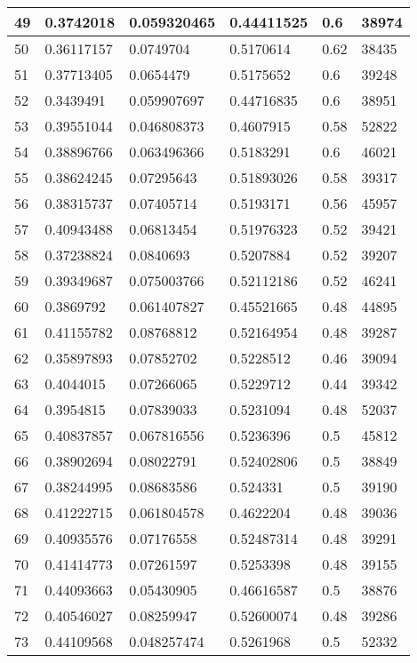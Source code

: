 \begin{longtable}{|l|l|l|l|l|l|}
49 & 0.3742018 & 0.059320465 & 0.44411525 & 0.6 & 38974 \\ \hline 
50 & 0.36117157 & 0.0749704 & 0.5170614 & 0.62 & 38435 \\ \hline 
51 & 0.37713405 & 0.0654479 & 0.5175652 & 0.6 & 39248 \\ \hline 
52 & 0.3439491 & 0.059907697 & 0.44716835 & 0.6 & 38951 \\ \hline 
53 & 0.39551044 & 0.046808373 & 0.4607915 & 0.58 & 52822 \\ \hline 
54 & 0.38896766 & 0.063496366 & 0.5183291 & 0.6 & 46021 \\ \hline 
55 & 0.38624245 & 0.07295643 & 0.51893026 & 0.58 & 39317 \\ \hline 
56 & 0.38315737 & 0.07405714 & 0.5193171 & 0.56 & 45957 \\ \hline 
57 & 0.40943488 & 0.06813454 & 0.51976323 & 0.52 & 39421 \\ \hline 
58 & 0.37238824 & 0.0840693 & 0.5207884 & 0.52 & 39207 \\ \hline 
59 & 0.39349687 & 0.075003766 & 0.52112186 & 0.52 & 46241 \\ \hline 
60 & 0.3869792 & 0.061407827 & 0.45521665 & 0.48 & 44895 \\ \hline 
61 & 0.41155782 & 0.08768812 & 0.52164954 & 0.48 & 39287 \\ \hline 
62 & 0.35897893 & 0.07852702 & 0.5228512 & 0.46 & 39094 \\ \hline 
63 & 0.4044015 & 0.07266065 & 0.5229712 & 0.44 & 39342 \\ \hline 
64 & 0.3954815 & 0.07839033 & 0.5231094 & 0.48 & 52037 \\ \hline 
65 & 0.40837857 & 0.067816556 & 0.5236396 & 0.5 & 45812 \\ \hline 
66 & 0.38902694 & 0.08022791 & 0.52402806 & 0.5 & 38849 \\ \hline 
67 & 0.38244995 & 0.08683586 & 0.524331 & 0.5 & 39190 \\ \hline 
68 & 0.41222715 & 0.061804578 & 0.4622204 & 0.48 & 39036 \\ \hline 
69 & 0.40935576 & 0.07176558 & 0.52487314 & 0.48 & 39291 \\ \hline 
70 & 0.41414773 & 0.07261597 & 0.5253398 & 0.48 & 39155 \\ \hline 
71 & 0.44093663 & 0.05430905 & 0.46616587 & 0.5 & 38876 \\ \hline 
72 & 0.40546027 & 0.08259947 & 0.52600074 & 0.48 & 39286 \\ \hline 
73 & 0.44109568 & 0.048257474 & 0.5261968 & 0.5 & 52332 \\ \hline 

\end{longtable}
